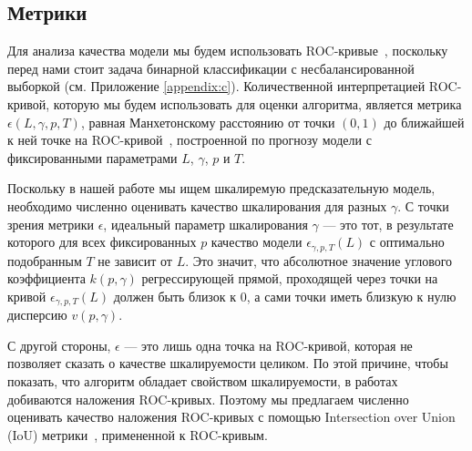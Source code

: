 \subsection{Метрики}

Для анализа качества модели мы будем использовать ROC-кривые~\cite{Molchan1997}, поскольку перед нами стоит задача бинарной классификации с несбалансированной выборкой (см. Приложение \ref{appendix:c}).  Количественной интерпретацией ROC-кривой, которую мы будем использовать для оценки алгоритма, является метрика $\epsilon(L,\gamma,p,T)$, равная Манхетонскому расстоянию от точки $(0, 1)$ до ближайшей к ней точке на ROC-кривой~\cite{Hallerberg2009,Shapoval2006}, построенной по прогнозу модели с фиксированными параметрами $L$, $\gamma$, $p$ и $T$.

Поскольку в нашей работе мы ищем шкалиремую предсказательную модель, необходимо численно оценивать качество шкалирования для разных $\gamma$. С точки зрения метрики $\epsilon$, идеальный параметр шкалирования $\gamma$ --- это тот, в результате которого для всех фиксированных $p$ качество модели $\epsilon_{\gamma,p,T}(L)$ с оптимально подобранным $T$ не зависит от $L$. Это значит, что абсолютное значение углового коэффициента $k(p, \gamma)$ регрессирующей прямой, проходящей через точки на кривой $\epsilon_{\gamma,p,T}(L)$ должен быть близок к $0$, а сами точки иметь близкую к нулю дисперсию $v(p, \gamma)$.

С другой стороны, $\epsilon$ --- это лишь одна точка на ROC-кривой, которая не позволяет сказать о качестве шкалируемости целиком. По этой причине, чтобы показать, что алгоритм обладает свойством шкалируемости, в работах~\cite{Hallerberg2009,deluca} добиваются наложения ROC-кривых. Поэтому мы предлагаем численно оценивать качество наложения ROC-кривых с помощью Intersection over Union (IoU) метрики~\cite{Murphy1996,Cordts2016,Alhaija2018}, примененной к ROC-кривым.
